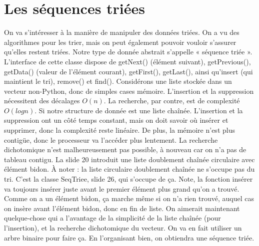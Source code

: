 \documentclass[10pt]{article}
\begin{document}
\section{Les séquences triées}
On va s'intéresser à la manière de manipuler des données triées. On a vu des algorithmes pour les trier, mais on peut également pouvoir vouloir s'assurer qu'elles restent triées.  
\newline \newline 
Notre type de donnée abstrait s'appelle « séquence triée ». L'interface de cette classe dispose de getNext() (élément suivant), getPrevious(), getData() (valeur de l'élément courant), getFirst(), getLast(), ainsi qu'insert (qui maintient le tri), remove() et find(). 
\newline \newline 
Considérons une liste stockée dans un vecteur non-Python, donc de simples cases mémoire. L'insertion et la suppression nécessitent des décalages $O(n)$. La recherche, par contre, est de complexité $O(log n)$.  
\newline \newline 
Si notre structure de donnée est une liste chaînée. L'insertion et la suppression ont un côté temps constant, mais on doit savoir où insérer et supprimer, donc la complexité reste linéaire. De plus, la mémoire n'est plus contigüe, donc le processeur va l'accéder plus lentement. La recherche dichotomique n'est malheureusement pas possible, à nouveau car on n'a pas de tableau contigu. 
\newline \newline 
La slide 20 introduit une liste doublement chaînée circulaire avec élément bidon. À noter : la liste circulaire doublement chaînée ne s'occupe pas du tri. C'est la classe SeqTriee, slide 26, qui s'occupe de ça. Note, la fonction insérer va toujours insérer juste avant le premier élément plus grand qu'on a trouvé. Comme on a un élément bidon, ça marche même si on n'a rien trouvé, auquel cas on insère avant l'élément bidon, donc en fin de liste.  
\newline \newline 
On aimerait maintenant quelque-chose qui a l'avantage de la simplicité de la liste chaînée (pour l'insertion), et la recherche dichotomique du vecteur. On va en fait utiliser un arbre binaire pour faire ça. En l'organisant bien, on obtiendra une séquence triée.
\end{document}
